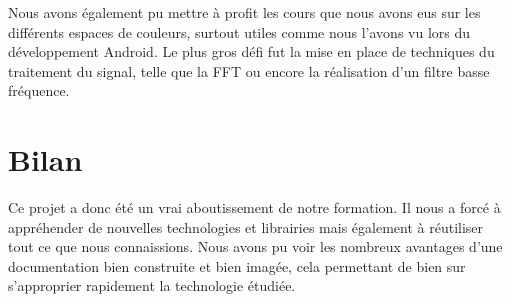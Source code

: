 Nous avons également pu mettre à profit les cours que nous avons eus sur les différents espaces de couleurs, surtout utiles comme nous l'avons vu lors du développement Android.
Le plus gros défi fut la mise en place de techniques du traitement du signal, telle que la FFT ou encore la réalisation d'un filtre basse fréquence.

\section{Bilan}

Ce projet a donc été un vrai aboutissement de notre formation. Il nous a forcé à appréhender de nouvelles technologies et librairies mais également à réutiliser tout ce que nous
 connaissions. Nous avons pu voir les nombreux avantages d'une documentation bien construite et bien imagée, cela permettant de bien sur s'approprier rapidement la technologie étudiée.

